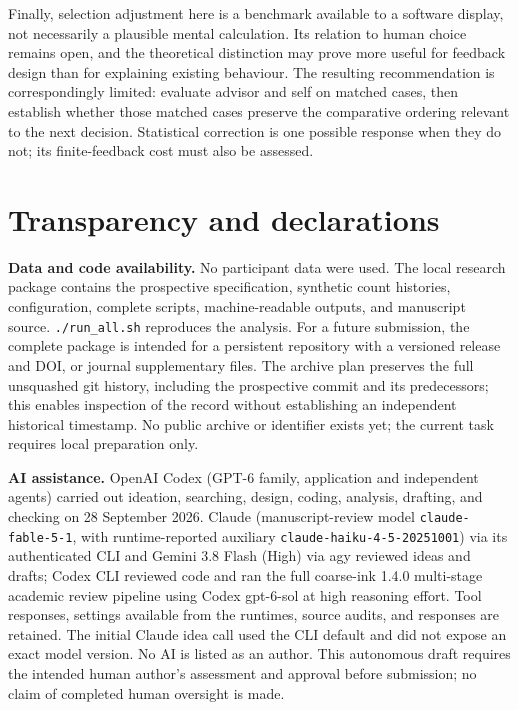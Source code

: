 \documentclass[
  british,
  11pt,
]{article}
\begin{document}
Finally, selection adjustment here is a benchmark available to a
software display, not necessarily a plausible mental calculation. Its
relation to human choice remains open, and the theoretical distinction
may prove more useful for feedback design than for explaining existing
behaviour. The resulting recommendation is correspondingly limited:
evaluate advisor and self on matched cases, then establish whether those
matched cases preserve the comparative ordering relevant to the next
decision. Statistical correction is one possible response when they do
not; its finite-feedback cost must also be assessed.

\section{Transparency and
declarations}\label{transparency-and-declarations}

\textbf{Data and code availability.} No participant data were used. The
local research package contains the prospective specification, synthetic
count histories, configuration, complete scripts, machine-readable
outputs, and manuscript source. \texttt{./run\_all.sh} reproduces the
analysis. For a future submission, the complete package is intended for
a persistent repository with a versioned release and DOI, or journal
supplementary files. The archive plan preserves the full unsquashed git
history, including the prospective commit and its predecessors; this
enables inspection of the record without establishing an independent
historical timestamp. No public archive or identifier exists yet; the
current task requires local preparation only.

\textbf{AI assistance.} OpenAI Codex (GPT-6 family, application and
independent agents) carried out ideation, searching, design, coding,
analysis, drafting, and checking on 28 September 2026. Claude
(manuscript-review model \texttt{claude-fable-5-1}, with
runtime-reported auxiliary \texttt{claude-haiku-4-5-20251001}) via its
authenticated CLI and Gemini 3.8 Flash (High) via agy reviewed ideas and
drafts; Codex CLI reviewed code and ran the full coarse-ink 1.4.0
multi-stage academic review pipeline using Codex gpt-6-sol at high
reasoning effort. Tool responses, settings available from the runtimes,
source audits, and responses are retained. The initial Claude idea call
used the CLI default and did not expose an exact model version. No AI is
listed as an author. This autonomous draft requires the intended human
author's assessment and approval before submission; no claim of
completed human oversight is made.
\end{document}
